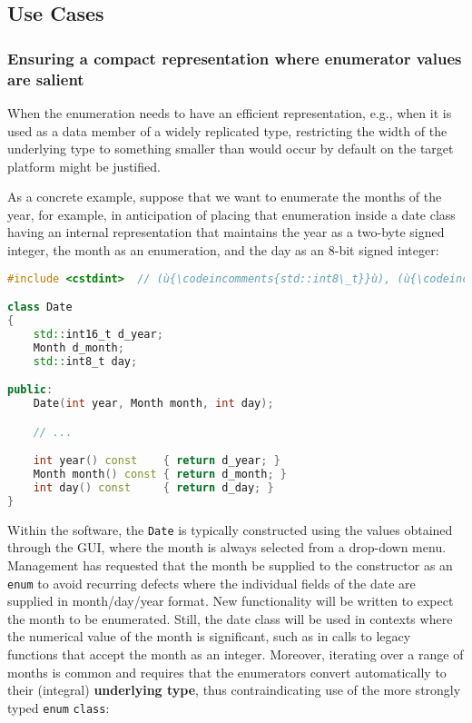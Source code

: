 \subsection[Use Cases]{Use Cases}\label{use-cases}

\subsubsection[Ensuring a compact representation where enumerator values are salient]{Ensuring a compact representation where enumerator values are salient}\label{ensuring-a-compact-representation-where-enumerator-values-are-salient}

When the enumeration needs to have an efficient representation, e.g.,
when it is used as a data member of a widely replicated type,
restricting the width of the underlying type to something smaller than
would occur by default on the target platform might be justified.

As a concrete example, suppose that we want to enumerate the months of
the year, for example, in anticipation of placing that enumeration
inside a date class having an internal representation that maintains the
year as a two-byte signed integer, the month as an enumeration, and the
day as an 8-bit signed integer:

\begin{lstlisting}[language=C++]
#include <cstdint>  // (ù{\codeincomments{std::int8\_t}}ù), (ù{\codeincomments{std::int16\_t}}ù)

class Date
{
    std::int16_t d_year;
    Month d_month;
    std::int8_t day;

public:
    Date(int year, Month month, int day);

    // ...

    int year() const    { return d_year; }
    Month month() const { return d_month; }
    int day() const     { return d_day; }
}
\end{lstlisting}
    
\noindent Within the software, the \texttt{Date} is typically constructed using
the values obtained through the GUI, where the month is always selected
from a drop-down menu. Management has requested that the month be
supplied to the constructor as an \texttt{enum} to avoid recurring
defects where the individual fields of the date are supplied in
month/day/year format. New functionality will be written to expect the
month to be enumerated. Still, the date class will be used in contexts
where the numerical value of the month is significant, such as in calls
to legacy functions that accept the month as an integer. Moreover,
iterating over a range of months is common and requires that the
enumerators convert automatically to their (integral) \textbf{underlying
type}, thus contraindicating use of the more strongly typed
\texttt{enum} \texttt{class}:

